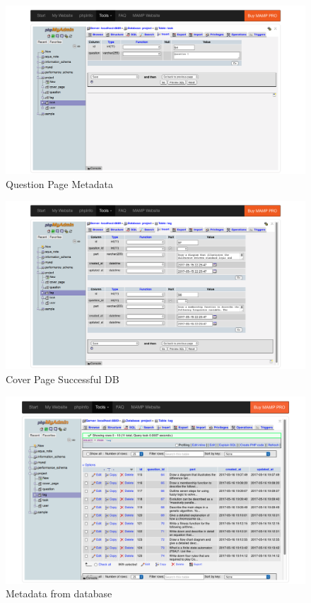 \begin{figure}[htbp]
   \centering
   \includegraphics[width=400pt]{figures/tasks_question.png} %
   \caption{Question Page Metadata}
   \label{fig:Question Page Metadata}
\end{figure}

\begin{figure}[htbp]
   \centering
   \includegraphics[width=400pt]{figures/tasks_question_db.png} %
   \caption{Cover Page Successful DB}
   \label{fig:Cover Page Successful DB}
\end{figure}

\begin{figure}[htbp]
   \centering
   \includegraphics[width=400pt]{figures/historical_data.png} %
   \caption{Metadata from database}
   \label{fig:Metadata from database}
\end{figure}
